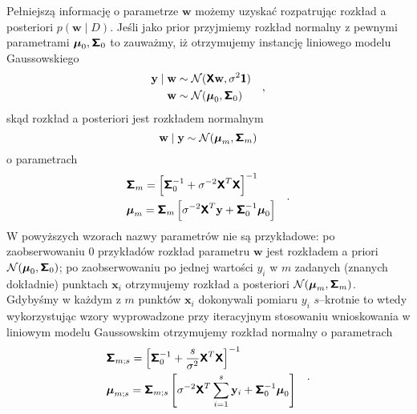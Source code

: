 \documentclass{myclass}
\begin{document}
Pełniejszą informację o parametrze \(\mathbf{w}\) możemy uzyskać rozpatrując rozkład a posteriori
\(p(\mathbf{w} \mid D)\). Jeśli jako prior przyjmiemy rozkład normalny z pewnymi parametrami
\(\boldsymbol{\mu}_0, \boldsymbol{\mathsf{\Sigma}}_0\) to zauważmy, iż otrzymujemy instancję liniowego modelu
Gaussowskiego
\begin{equation*}
    \begin{split}
        \mathbf{y} \mid \mathbf{w} &\sim \mathcal{N}(\boldsymbol{\mathsf{X}}\mathbf{w}, \sigma^2\boldsymbol{\mathsf{1}})\\
        \mathbf{w} &\sim \mathcal{N}(\boldsymbol{\mu}_0, \boldsymbol{\mathsf{\Sigma}}_0)
    \end{split}\quad,
\end{equation*}
skąd rozkład a posteriori jest rozkładem normalnym
\begin{equation*}
    \mathbf{w} \mid \mathbf{y} \sim \mathcal{N}(\boldsymbol{\mu}_m, \boldsymbol{\mathsf{\Sigma}}_m)
\end{equation*}
o parametrach
\begin{equation*}
    \begin{split}
        &\boldsymbol{\mathsf{\Sigma}}_m = \left[\boldsymbol{\mathsf{\Sigma}}_0^{-1} + \sigma^{-2}\boldsymbol{\mathsf{X}}^T\boldsymbol{\mathsf{X}}\right]^{-1}\\
        &\boldsymbol{\mu}_m = \boldsymbol{\mathsf{\Sigma}}_m\left[\sigma^{-2}\boldsymbol{\mathsf{X}}^T\mathbf{y} + \boldsymbol{\mathsf{\Sigma}}_0^{-1}\boldsymbol{\mu}_0\right]    
    \end{split}\quad.
\end{equation*}
W powyższych wzorach nazwy parametrów nie są przykładowe: po zaobserwowaniu 0 przykładów rozkład
parametru \(\mathbf{w}\) jest rozkładem a priori \(\mathcal{N}(\boldsymbol{\mu}_0,
\boldsymbol{\mathsf{\Sigma}}_0)\); po zaobserwowaniu po jednej wartości \(y_i\) w \(m\) zadanych (znanych
dokładnie) punktach \(\mathbf{x}_i\) otrzymujemy rozkład a posteriori
\(\mathcal{N}(\boldsymbol{\mu}_m, \boldsymbol{\mathsf{\Sigma}}_m)\). Gdybyśmy w każdym z \(m\) punktów
\(\mathbf{x}_i\) dokonywali pomiaru \(y_i\) \(s\)--krotnie to wtedy wykorzystując wzory wyprowadzone
przy iteracyjnym stosowaniu wnioskowania w liniowym modelu Gaussowskim otrzymujemy rozkład normalny
o parametrach
\begin{equation*}
    \begin{split}
        &\boldsymbol{\mathsf{\Sigma}}_{m;s} = \left[\boldsymbol{\mathsf{\Sigma}}_0^{-1} + \frac{s}{\sigma^2}\boldsymbol{\mathsf{X}}^T\boldsymbol{\mathsf{X}}\right]^{-1}\\
        &\boldsymbol{\mu}_{m;s} = \boldsymbol{\mathsf{\Sigma}}_{m;s}\left[\sigma^{-2}\boldsymbol{\mathsf{X}}^T\sum_{i=1}^s\mathbf{y}_i + \boldsymbol{\mathsf{\Sigma}}_0^{-1}\boldsymbol{\mu}_0\right]    
    \end{split}\quad.
\end{equation*} 
\end{document}
